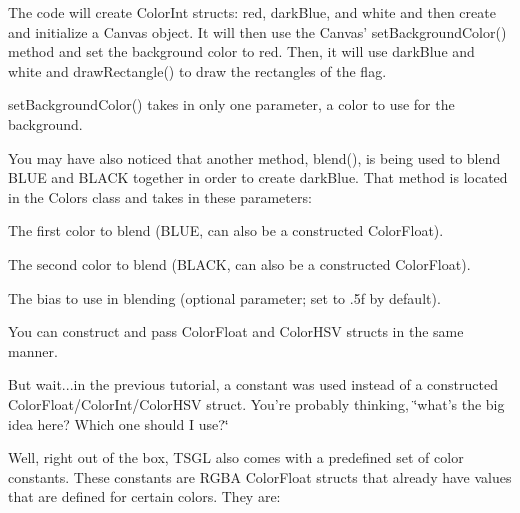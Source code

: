 The code will create {\ttfamily Color\-Int} structs\-: {\ttfamily red}, {\ttfamily dark\-Blue}, and {\ttfamily white} and then create and initialize a Canvas object. It will then use the Canvas' {\ttfamily set\-Background\-Color()} method and set the background color to {\ttfamily red}. Then, it will use {\ttfamily dark\-Blue} and {\ttfamily white} and {\ttfamily draw\-Rectangle()} to draw the rectangles of the flag.

{\ttfamily set\-Background\-Color()} takes in only one parameter, a color to use for the background.

You may have also noticed that another method, {\ttfamily blend()}, is being used to blend {\ttfamily B\-L\-U\-E} and {\ttfamily B\-L\-A\-C\-K} together in order to create {\ttfamily dark\-Blue}. That method is located in the {\ttfamily Colors} class and takes in these parameters\-:


\begin{DoxyItemize}
\item The first color to blend ({\ttfamily B\-L\-U\-E}, can also be a constructed {\ttfamily Color\-Float}).
\item The second color to blend ({\ttfamily B\-L\-A\-C\-K}, can also be a constructed {\ttfamily Color\-Float}).
\item The bias to use in blending (optional parameter; set to {.\-5f} by default).
\end{DoxyItemize}

You can construct and pass {\ttfamily Color\-Float} and {\ttfamily Color\-H\-S\-V} structs in the same manner.

But wait...in the previous tutorial, a constant was used instead of a constructed {\ttfamily Color\-Float/\-Color\-Int/\-Color\-H\-S\-V} struct. You're probably thinking, \char`\"{}what's the big idea here? Which one should I use?\char`\"{}

Well, right out of the box, T\-S\-G\-L also comes with a predefined set of color constants. These constants are R\-G\-B\-A {\ttfamily Color\-Float} structs that already have values that are defined for certain colors. They are\-:


